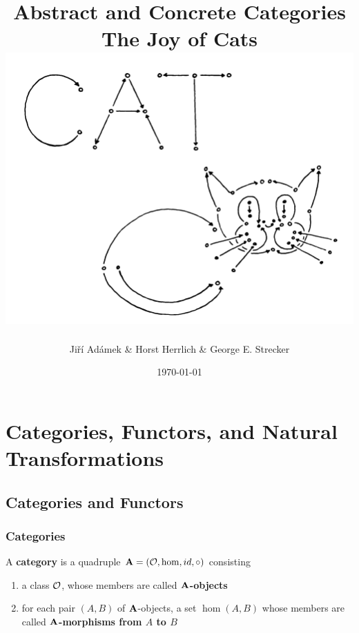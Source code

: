 \documentclass[11pt]{article}
\author{Jiří Adámek \& Horst Herrlich \& George E. Strecker}
\date{\today}
\title{\aunclfamily\Huge Abstract and Concrete Categories \\ The Joy of Cats \\ \includegraphics[scale=1.2]{cat.png}}
\begin{document}
\maketitle \clearpage
\setcounter{tocdepth}{2}
\tableofcontents \clearpage\section{Categories, Functors, and Natural Transformations}
\label{sec:org7de109f}
\subsection{Categories and Functors}
\label{sec:org28b13b6}
\subsubsection{Categories}
\label{sec:orgf070b17}
\begin{definition}[]
A \textbf{category} is a quadruple \(\operatorname{\textbf{A}}=(\mathcal{O},\operatorname{hom},id,\circ)\) consisting
\begin{enumerate}
\item a class \(\mathcal{O}\), whose members are called \textbf{\(\operatorname{\textbf{A}}\)-objects}
\item for each pair \((A,B)\) of \(\operatorname{\textbf{A}}\)-objects, a set \(\hom(A,B)\) whose
members are called \textbf{\(\operatorname{\textbf{A}}\)-morphisms from \(A\) to \(B\)}
\end{enumerate}
\end{definition}
\end{document}
